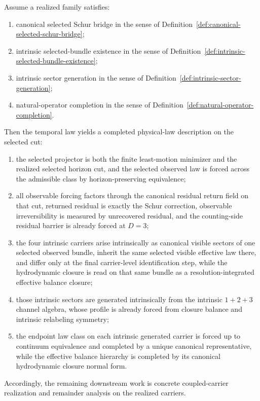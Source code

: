 \begin{theorem}
\label{thm:part-iv-law-completion}
Assume a realized family satisfies:
\begin{enumerate}[label=(\roman*), leftmargin=2em, itemsep=0.2em]
\item canonical selected Schur bridge in the sense of
      Definition~\ref{def:canonical-selected-schur-bridge};
\item intrinsic selected-bundle existence in the sense of
      Definition~\ref{def:intrinsic-selected-bundle-existence};
\item intrinsic sector generation in the sense of
      Definition~\ref{def:intrinsic-sector-generation};
\item natural-operator completion in the sense of
      Definition~\ref{def:natural-operator-completion}.
\end{enumerate}
Then the temporal law yields a completed physical-law description on the selected
cut:
\begin{enumerate}[label=(\alph*), leftmargin=2em, itemsep=0.2em]
\item the selected projector is both the finite least-motion minimizer and the
      realized selected horizon cut, and the selected observed law is forced
      across the admissible class by horizon-preserving equivalence;
\item all observable forcing factors through the canonical residual return
      field on that cut, returned residual is exactly the Schur correction,
      observable irreversibility is measured by unrecovered residual, and the
      counting-side residual barrier is already forced at \(D=3\);
\item the four intrinsic carriers arise intrinsically as canonical
      visible sectors of one selected observed bundle, inherit the same
      selected visible effective law there, and differ only at the final
      carrier-level identification step, while the hydrodynamic closure is read
      on that same bundle as a resolution-integrated effective balance
      closure;
\item those intrinsic sectors are generated intrinsically from the intrinsic
      \(1+2+3\) channel algebra, whose profile is already forced from closure
      balance and intrinsic relabeling symmetry;
\item the endpoint law class on each intrinsic generated carrier is
      forced up to continuum equivalence and completed by a unique canonical
      representative, while the effective balance hierarchy is completed by its
      canonical hydrodynamic closure normal form.
\end{enumerate}
Accordingly, the remaining downstream work is concrete coupled-carrier
realization and remainder analysis on the realized carriers.
\end{theorem}

